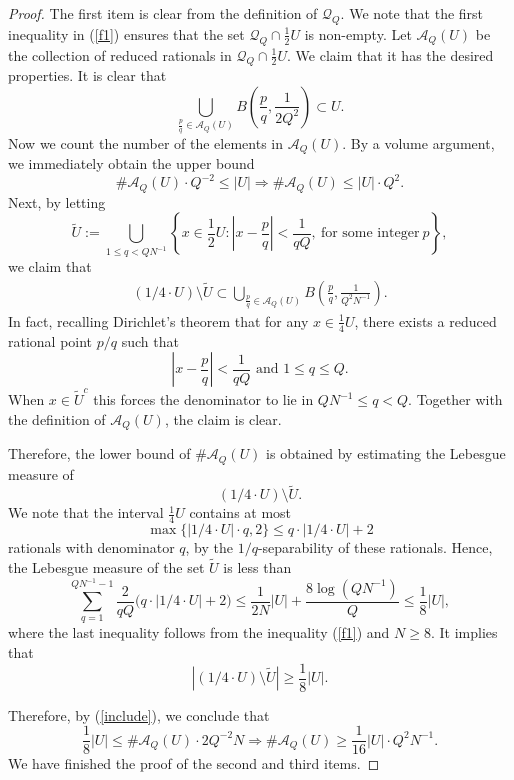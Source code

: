 \documentclass[11pt]{amsart}
\numberwithin{equation}{section}
\newcommand{\0}{\mathbf{0}}
\theoremstyle{remark}
\begin{document}
    \begin{proof}
        The first item is clear from the definition
        of $\mathcal{Q}_{Q}$.
        We note that the first inequality in (\ref{f1}) ensures that the set $\mathcal{Q}_{Q}\cap \frac12U$ is non-empty.
        Let $\mathcal{A}_{Q}(U)$ be the collection of reduced rationals in $\mathcal{Q}_Q \cap \frac{1}{2}U$. We claim that it has the desired properties. It is clear that $$
        \bigcup_{\frac{p}{q}\in \mathcal{A}_{Q}(U)}B\left(\frac{p}{q},\frac{1}{2Q^2}\right)\subset U.
        $$
Now we count the number of the elements in $\mathcal{A}_{Q}(U)$. By a volume argument, we immediately obtain the upper bound
$$\#\mathcal{A}_{Q}(U)\cdot Q^{-2}\le |U|\Longrightarrow \#\mathcal{A}_{Q}(U)\le |U|\cdot Q^{2}.$$
Next, by letting
$$\widetilde{U}:=\bigcup_{1\le q< QN^{-1}}\left\{x\in \frac12U:\left|x-\frac{p}{q}\right|<\frac{1}{qQ}, \ {\text{for some integer}}\ p\right\},$$
we claim that
\begin{align}\label{include}
   (1/4\cdot U)\setminus \widetilde{U}\subset \bigcup_{\frac{p}{q}\in \mathcal{A}_{Q}(U)}B\left(\frac{p}{q},\frac{1}{Q^{2}N^{-1}}\right).
   \end{align}
In fact, recalling Dirichlet's theorem that for any $x\in \frac14U$, there exists a reduced rational point $p/q$ such that
        $$\left|x-\frac{p}{q}\right|<\frac{1}{qQ}\textrm{ and }1\le q\le Q.$$
        When $x\in \widetilde{U}^c$ this forces the denominator to lie in $QN^{-1} \le q<Q$. Together with the definition of $\mathcal{A}_{Q}(U)$, the claim is clear.

        Therefore, the lower bound of $\#\mathcal{A}_{Q}(U)$ is obtained by estimating the Lebesgue measure of
        $$(1/4\cdot U)\setminus \widetilde{U}.$$
        We note that the interval $\frac14U$ contains at most
        $$\max\big\{|1/4\cdot U|\cdot q,2\big\}\le q\cdot |1/4\cdot U|+2$$
        rationals with denominator $q$, by the $1/q$-separability of these rationals.
        Hence, the Lebesgue measure of the set $\widetilde{U}$ is less than
        $$\sum_{q=1}^{QN^{-1}-1}\frac{2}{qQ}\bigl(q\cdot|1/4\cdot U|+2\bigr)
\le \frac{1}{2N}|U|
   +\frac{8\log (QN^{-1})}{Q}
\le \frac{1}{8}|U|,$$
where the last inequality follows from the inequality (\ref{f1}) and $N\ge 8$. It implies that
        $$|(1/4\cdot U)\setminus \widetilde{U}|\ge \frac18 |U|.$$

        Therefore, by (\ref{include}), we conclude that
        $$\frac{1}{8}|U|\le\#\mathcal{A}_{Q}(U)\cdot 2Q^{-2}N\Longrightarrow \#\mathcal{A}_{Q}(U)\ge \frac{1}{16}|U|\cdot Q^{2}N^{-1}.$$
        We have finished the proof of the second and third items.

    \end{proof}
\end{document}
